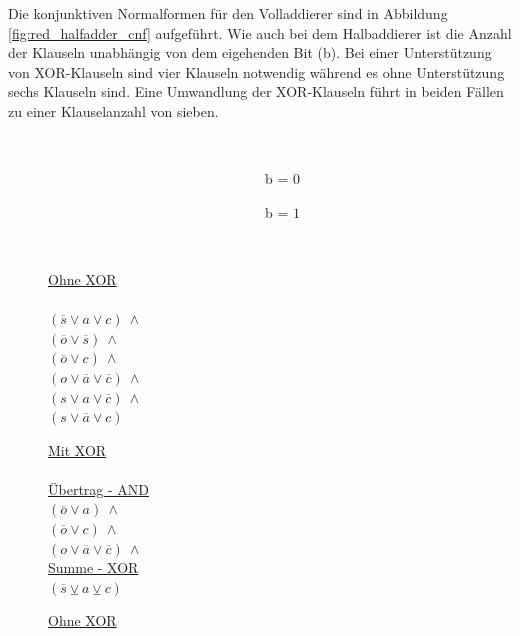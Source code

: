 Die konjunktiven Normalformen für den Volladdierer sind in Abbildung \ref{fig:red_halfadder_cnf} aufgeführt. Wie auch bei dem Halbaddierer ist die Anzahl
der Klauseln unabhängig von dem eigehenden Bit (b). Bei einer Unterstützung von XOR-Klauseln sind vier Klauseln notwendig während es ohne Unterstützung
sechs Klauseln sind. Eine Umwandlung der XOR-Klauseln führt in beiden Fällen zu einer Klauselanzahl von sieben.
\begin{figure}[!h]
  \centering
  \begin{minipage}[c]{0.3cm}
    ~
  \end{minipage}
  \begin{minipage}[c]{7.1cm}
    ~~~~~~~~~~~~~~~~~~~~~~~~~~~~~~~b = $0$
  \end{minipage}
  \begin{minipage}[c]{7cm}
    ~~~~~~~~~~~~~~~~~~~~~~~~~~~~~~~b = $1$
  \end{minipage}
  \begin{minipage}[l]{0.4cm}
    ~
  \end{minipage}
  \begin{minipage}[l]{3.5cm}
    \underline{Ohne XOR}\\
    ~\\
    $ (\overline{s} \vee a \vee c) ~ \wedge $\\
    $ (\overline{o} \vee \overline{s}) ~ \wedge $\\
    $ (\overline{o} \vee c) ~ \wedge $\\
    $ (o \vee \overline{a} \vee \overline{c}) ~ \wedge $\\
    $ (s \vee a \vee \overline{c}) ~ \wedge $\\
    $ (s \vee \overline{a} \vee c) $
  \end{minipage}
  \begin{minipage}[l]{3.5cm}
    \underline{Mit XOR}\\
    ~\\
    \underline{Übertrag - AND}\\
    $ (\overline{o} \vee a) ~ \wedge $\\
    $ (\overline{o} \vee c) ~ \wedge $\\
    $ (o \vee \overline{a} \vee \overline{c}) ~ \wedge $\\
    \underline{Summe - XOR}\\
    $ (\overline{s} \veebar a \veebar c) $
  \end{minipage}
  \begin{minipage}[l]{3.5cm}
    \underline{Ohne XOR}\\

\end{minipage}
\end{figure}
